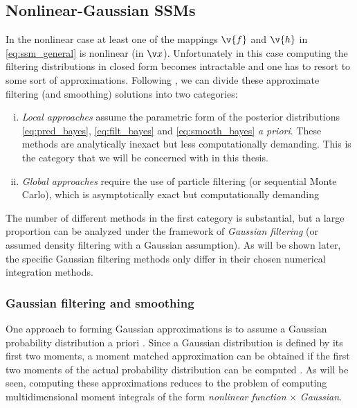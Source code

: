 \subsection{Nonlinear-Gaussian SSMs}%
\label{sec:nonlinear_state}
In the nonlinear case at least one of the mappings $\v{f}$ and $\v{h}$ in
\eqref{eq:ssm_general} is nonlinear (in $\x$). Unfortunately in this case computing the filtering
distributions in closed form becomes intractable and one has to resort to 
some sort of approximations. Following \textcite{Arasaratnam2009}, we can
divide these approximate filtering (and smoothing) solutions into two 
categories: 
\begin{enumerate}[i)] \addtolength{\leftskip}{.5cm} \itemsep1pt \parskip0pt 
  \item \emph{Local approaches} assume the parametric form of the posterior
  distributions \eqref{eq:pred_bayes}, \eqref{eq:filt_bayes} and \eqref{eq:smooth_bayes} \emph{a priori}. 
  These  methods are analytically inexact but less computationally demanding. This is the category that
we will be concerned with in this thesis. 
  \item \emph{Global approaches} require the use of particle filtering (or sequential Monte Carlo), 
  which is asymptotically exact but computationally demanding
\end{enumerate}%
%
The number of different methods in the first category is substantial,
but a large proportion can be analyzed under the framework of
\emph{Gaussian filtering} (or assumed density filtering
with a Gaussian assumption). As will be shown later, the specific Gaussian filtering 
methods only differ in their chosen numerical integration methods.  

\subsubsection{Gaussian filtering and smoothing}

One approach to forming Gaussian approximations is to assume a Gaussian
probability distribution a priori \parencite{Ito2000,Wu2006,Sarkka2010}. 
Since a Gaussian distribution is 
defined by its first two moments, a moment matched approximation
can be obtained if the first two moments of the actual probability
distribution can be computed \parencite{Ito2000,Sarkka2006}. As will
be seen, computing these approximations reduces to the problem
of computing multidimensional moment integrals of the form 
\emph{nonlinear function} $\times$ \emph{Gaussian}. 

